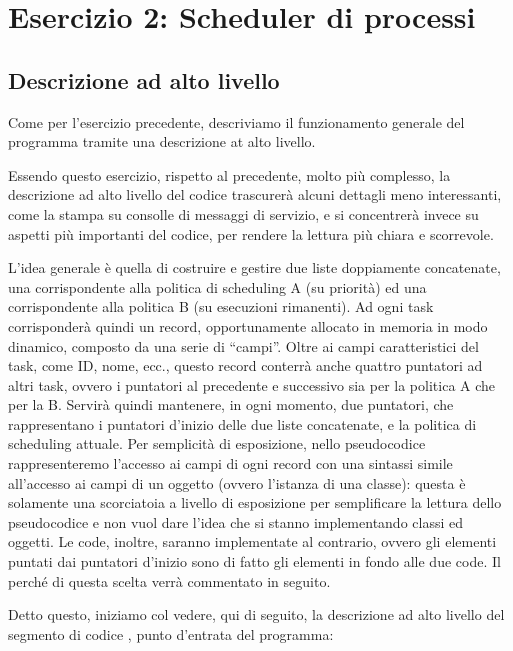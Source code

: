 \section*{Esercizio 2: Scheduler di processi}

    \subsection*{Descrizione ad alto livello}
    
        Come per l'esercizio precedente, descriviamo il funzionamento generale del programma tramite una descrizione at alto livello.
        
        Essendo questo esercizio, rispetto al precedente, molto più complesso, la descrizione ad alto livello del codice trascurerà alcuni dettagli meno interessanti, come la stampa su consolle di messaggi di servizio, e si concentrerà invece su aspetti più importanti del codice, per rendere la lettura più chiara e scorrevole.
        
        L'idea generale è quella di costruire e gestire due liste doppiamente concatenate, una corrispondente alla politica di scheduling A (su priorità) ed una corrispondente alla politica B (su esecuzioni rimanenti). Ad ogni task corrisponderà quindi un record, opportunamente allocato in memoria in modo dinamico, composto da una serie di ``campi''. Oltre ai campi caratteristici del task, come ID, nome, ecc., questo record conterrà anche quattro puntatori ad altri task, ovvero i puntatori al precedente e successivo sia per la politica A che per la B. Servirà quindi mantenere, in ogni momento, due puntatori, che rappresentano i puntatori d'inizio delle due liste concatenate, e la politica di scheduling attuale. Per semplicità di esposizione, nello pseudocodice rappresenteremo l'accesso ai campi di ogni record con una sintassi simile all'accesso ai campi di un oggetto (ovvero l'istanza di una classe): questa è solamente una scorciatoia a livello di esposizione per semplificare la lettura dello pseudocodice e non vuol dare l'idea che si stanno implementando classi ed oggetti. Le code, inoltre, saranno implementate al contrario, ovvero gli elementi puntati dai puntatori d'inizio sono di fatto gli elementi in fondo alle due code. Il perché di questa scelta verrà commentato in seguito.
        
        Detto questo, iniziamo col vedere, qui di seguito, la descrizione ad alto livello del segmento di codice , punto d'entrata del programma:
        
